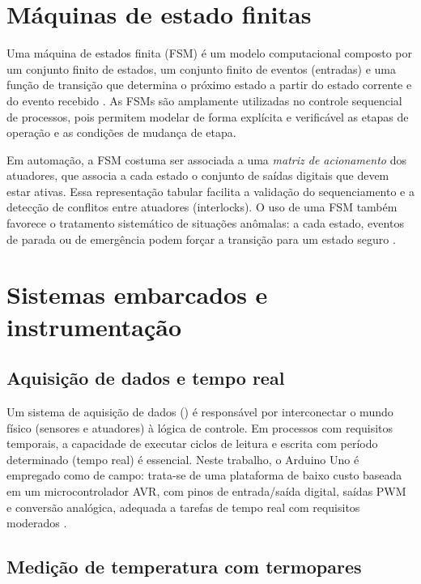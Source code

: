 \section{M\'aquinas de estado finitas}

Uma m\'aquina de estados finita (FSM) \'e um modelo computacional composto por
um conjunto finito de estados, um conjunto finito de eventos (entradas) e uma
fun\c{c}\~ao de transi\c{c}\~ao que determina o pr\'oximo estado a partir do
estado corrente e do evento recebido \cite{wagner2006}. As FSMs s\~ao
amplamente utilizadas no controle sequencial de processos, pois permitem
modelar de forma expl\'icita e verific\'avel as etapas de opera\c{c}\~ao e as
condi\c{c}\~oes de mudan\c{c}a de etapa.

Em automa\c{c}\~ao, a FSM costuma ser associada a uma \emph{matriz de
acionamento} dos atuadores, que associa a cada estado o conjunto de sa\'idas
digitais que devem estar ativas. Essa representa\c{c}\~ao tabular facilita a
valida\c{c}\~ao do sequenciamento e a detec\c{c}\~ao de conflitos entre
atuadores (interlocks). O uso de uma FSM tamb\'em favorece o tratamento
sistem\'atico de situa\c{c}\~oes an\^omalas: a cada estado, eventos de parada ou
de emerg\^encia podem for\c{c}ar a transi\c{c}\~ao para um estado seguro
\cite{wagner2006}.

\section{Sistemas embarcados e instrumenta\c{c}\~ao}

\subsection{Aquisi\c{c}\~ao de dados e tempo real}

Um sistema de aquisi\c{c}\~ao de dados (\daq) \'e respons\'avel por
interconectar o mundo f\'isico (sensores e atuadores) \`a l\'ogica de controle.
Em processos com requisitos temporais, a capacidade de executar ciclos de
leitura e escrita com per\'iodo determinado (tempo real) \'e essencial. Neste
trabalho, o Arduino Uno \'e empregado como \daq de campo: trata-se de uma
plataforma de baixo custo baseada em um microcontrolador AVR, com pinos de
entrada/sa\'ida digital, sa\'idas PWM e convers\~ao anal\'ogica, adequada a
tarefas de tempo real com requisitos moderados \cite{arduino}.

\subsection{Medi\c{c}\~ao de temperatura com termopares}

